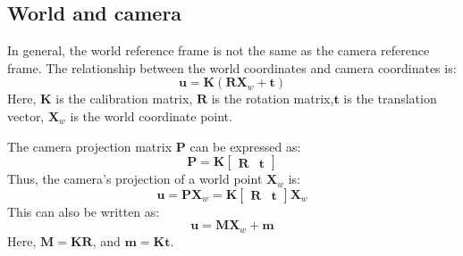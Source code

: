 \subsection{World and camera}
In general, the world reference frame is not the same as the camera reference frame. The relationship between the world coordinates and camera coordinates is:
\[\mathbf{u} = \mathbf{K} \left( \mathbf{R} \mathbf{X}_w + \mathbf{t} \right)\]
Here, $\mathbf{K}$ is the calibration matrix, $\mathbf{R}$ is the rotation matrix,$\mathbf{t}$ is the translation vector, $\mathbf{X}_w$ is the world coordinate point.

The camera projection matrix $\mathbf{P}$ can be expressed as:
\[\mathbf{P} = \mathbf{K} \begin{bmatrix} \mathbf{R} & \mathbf{t} \end{bmatrix}\]
Thus, the camera's projection of a world point $\mathbf{X}_w$ is:
\[\mathbf{u} = \mathbf{P} \mathbf{X}_w = \mathbf{K} \begin{bmatrix} \mathbf{R} & \mathbf{t} \end{bmatrix} \mathbf{X}_w\]
This can also be written as:
\[\mathbf{u} = \mathbf{M} \mathbf{X}_w + \mathbf{m}\]
Here, $\mathbf{M} = \mathbf{K} \mathbf{R}$, and $\mathbf{m} = \mathbf{K} \mathbf{t}$.